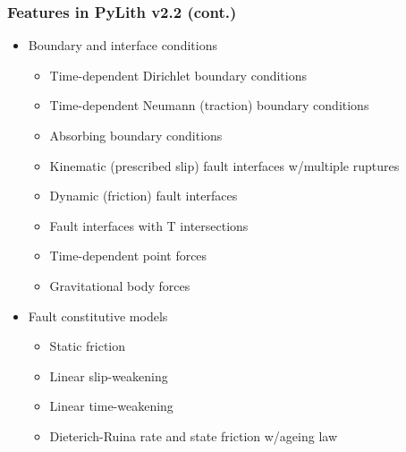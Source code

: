 \documentclass[aspectratio=169]{beamer}
\begin{document}
\begin{frame}
  \frametitle{Features in PyLith v2.2 (cont.)}
  \summary{}

  \begin{itemize}
  \item Boundary and interface conditions
    \begin{itemize}
    \item Time-dependent Dirichlet boundary conditions
    \item Time-dependent Neumann (traction) boundary conditions
    \item Absorbing boundary conditions
    \item Kinematic (prescribed slip) fault interfaces w/multiple ruptures
    \item Dynamic (friction) fault interfaces
    \item Fault interfaces with T intersections
    \item Time-dependent point forces
    \item Gravitational body forces
    \end{itemize}
  \item Fault constitutive models
    \begin{itemize}
    \item Static friction
    \item Linear slip-weakening
    \item Linear time-weakening
    \item Dieterich-Ruina rate and state friction w/ageing law
   \end{itemize}
 \end{itemize}

\end{frame}
\end{document}
